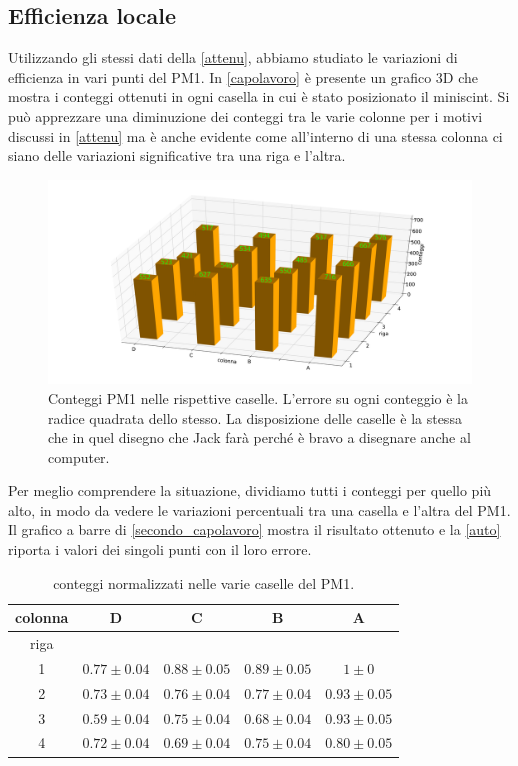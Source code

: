 \subsection{Efficienza locale}
\label{localis}
Utilizzando gli stessi dati della \autoref{attenu}, abbiamo studiato le variazioni di efficienza in vari punti del PM1. In \autoref{capolavoro} è presente un grafico 3D che mostra i conteggi ottenuti in ogni casella in cui è stato posizionato il miniscint. Si può apprezzare una diminuzione dei conteggi tra le varie colonne per i motivi discussi in \autoref{attenu} ma è anche evidente come all'interno di una stessa colonna ci siano delle variazioni significative tra una riga e l'altra.
\begin{figure}[h]
\flushleft
\includegraphics[width=17 cm]{3d_rit}
\caption{Conteggi PM1 nelle rispettive caselle. L'errore su ogni conteggio è la radice quadrata dello stesso. La disposizione delle caselle è la stessa che in quel disegno che Jack farà perché è bravo a disegnare anche al computer.}
\label{capolavoro}
\end{figure}

Per meglio comprendere la situazione, dividiamo tutti i conteggi per quello più alto, in modo da vedere le variazioni percentuali tra una casella e l'altra del PM1. Il grafico a barre di \autoref{secondo_capolavoro} mostra il risultato ottenuto e la \autoref{auto} riporta i valori dei singoli punti con il loro errore.

\begin{table}[h]
\centering
\begin{tabular}{|c|c|c|c|c|}
\hline
colonna & D & C & B & A \\
 \hline
riga  & & & &  \\
1 &  $ 0.77 \pm 0.04 $ & $ 0.88 \pm 0.05 $ & $ 0.89 \pm 0.05 $ & $ 1 \pm 0 $ \\ 
2 &  $ 0.73 \pm 0.04 $ & $ 0.76 \pm 0.04 $ & $ 0.77 \pm 0.04 $ & $ 0.93 \pm 0.05 $ \\ 
3 &  $ 0.59 \pm 0.04 $ & $ 0.75 \pm 0.04 $ & $ 0.68 \pm 0.04 $ & $ 0.93 \pm 0.05 $ \\ 
4 &  $ 0.72 \pm 0.04 $ & $ 0.69 \pm 0.04 $ & $ 0.75 \pm 0.04 $ & $ 0.80 \pm 0.05 $ \\
\hline 
\end{tabular}
\caption{conteggi normalizzati nelle varie caselle del PM1.}
\label{auto}
\end{table}

